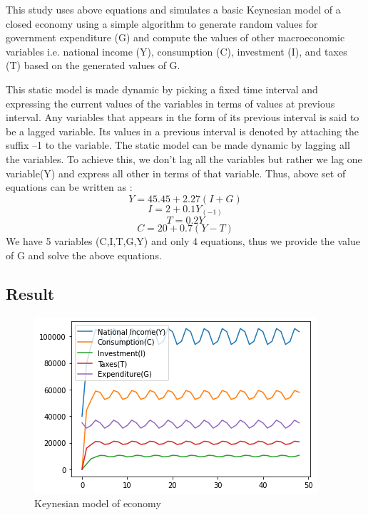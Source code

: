 \documentclass[10pt,journal,cspaper,compsoc]{IEEEtran}
\begin{document}
    This study uses above equations and simulates a basic Keynesian model of a closed economy using a simple algorithm to generate random values for government expenditure (G) and compute the values of other macroeconomic variables i.e. national income (Y), consumption (C), investment (I), and taxes (T) based on the generated values of G.
    
    This static model is made dynamic by picking a fixed time interval and expressing the
    current values of the variables in terms of values at previous interval. Any variables that appears in the form of its previous interval is said to be a lagged variable. Its values in a previous interval is denoted by attaching the suffix –1 to the variable. The static model can be made dynamic by lagging all the variables. To achieve this, we don't lag all the variables but rather we lag one variable(Y) and express all other in terms of that variable.
    Thus, above set of equations can be written as : 
    \begin{equation}
      Y = 45.45 + 2.27 (I + G)
    \end{equation}
    \begin{equation}
      I = 2 + 0.1 Y_(-1)
    \end{equation}
    \begin{equation}
      T = 0.2 Y
    \end{equation}
    \begin{equation}
      C = 20 + 0.7 ( Y - T )
    \end{equation}
    We have 5 variables (C,I,T,G,Y) and only 4 equations, thus we provide the value of G and solve the above equations. 
    \cite{lab5}
    \subsection{Result}
    \begin{figure}[h!]
      \centering
      \includegraphics[scale = 0.5]{images/Exp5_Example1.png}
      \caption{Keynesian model of economy}
    \end{figure}
\end{document}
